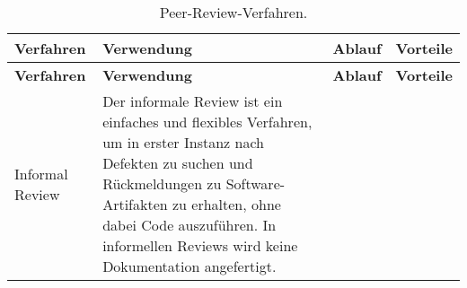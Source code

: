 {
    \def\arraystretch{1.1}%
    \begin{xltabular}{\linewidth}{
            @{}
            >{
                \linewidth
                \centering\arraybackslash
            }X
            >{
                \linewidth
                \raggedright\arraybackslash
            }X
            >{
                \linewidth
                \raggedright\arraybackslash
            }X
            >{
                \linewidth
                \raggedright\arraybackslash
            }X
            @{}
    }


    \caption{Peer-Review-Verfahren.} 
    \label{sec2:sota:table:peer-reviews} \\
        
    \toprule

    \textbf{Verfahren} & \textbf{Verwendung} & \textbf{Ablauf} & \textbf{Vorteile} \\
    
    \midrule
    
    \endfirsthead


    \toprule

    \textbf{Verfahren} & \textbf{Verwendung} & \textbf{Ablauf} & \textbf{Vorteile} \\
    
    \midrule
    
    \endhead
        

    Informal Review 
    & Der informale Review ist ein einfaches und flexibles Verfahren, um in erster Instanz nach Defekten zu suchen und Rückmeldungen zu Software-Artifakten zu erhalten, ohne dabei Code auszuführen. 
    In informellen Reviews wird keine Dokumentation angefertigt.
    & 
    & \\
        
    \bottomrule 

    \end{xltabular}
}